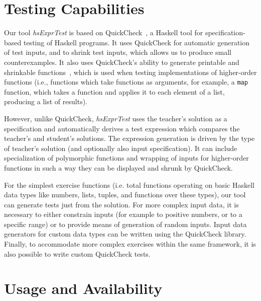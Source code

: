 \documentclass[sigconf]{acmart} %
\newcommand{\hsExprTest}{\textit{hsExprTest}}
\begin{document}


\maketitle

\section{Testing Capabilities}

Our tool \hsExprTest{} is based on QuickCheck~\cite{Koen2000}, a Haskell tool for
specification-based testing of Haskell programs.
It uses QuickCheck for automatic generation of test inputs, and to shrink test
inputs, which allows us to produce small counterexamples.
It also uses QuickCheck's ability to generate printable and shrinkable
functions~\cite{Koen2012}, which is used when testing implementations of
higher-order functions (i.e., functions which take functions as arguments, for
example, a \texttt{map} function, which takes a function and applies it to each
element of a list, producing a list of results).

However, unlike QuickCheck, \hsExprTest{} uses the teacher's solution as a
specification and automatically derives a test expression which compares the
teacher's and student's solutions.
The expression generation is driven by the type of teacher's solution (and
optionally also input specification).
It can include specialization of
polymorphic functions and wrapping of inputs for higher-order functions in such
a way they can be displayed and shrunk by QuickCheck.

For the simplest exercise functions (i.e. total functions operating on basic
Haskell data types like numbers, lists, tuples, and functions over these
types), our tool can generate tests just from the solution.
For more complex input data, it is necessary to either constrain inputs
(for example to positive numbers, or to a specific range) or to provide means
of generation of random inputs.
Input data generators for custom data types can be written using the QuickCheck
library.
Finally, to accommodate more complex exercises within the same framework, it is
also possible to write custom QuickCheck tests.

\section{Usage and Availability}
\end{document}
